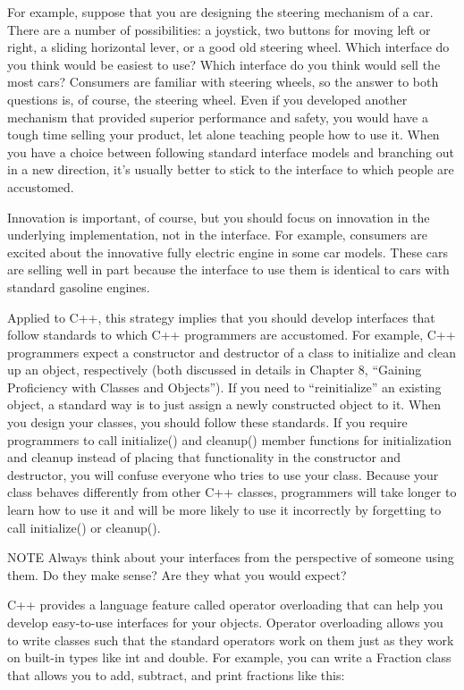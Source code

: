 For example, suppose that you are designing the steering mechanism of a car. There are a number of possibilities: a joystick, two buttons for moving left or right, a sliding horizontal lever, or a good old steering wheel. Which interface do you think would be easiest to use? Which interface do you think would sell the most cars? Consumers are familiar with steering wheels, so the answer to both questions is, of course, the steering wheel. Even if you developed another mechanism that provided superior performance and safety, you would have a tough time selling your product, let alone teaching people how to use it. When you have a choice between following standard interface models and branching out in a new direction, it’s usually better to stick to the interface to which people are accustomed.

Innovation is important, of course, but you should focus on innovation in the underlying implementation, not in the interface. For example, consumers are excited about the innovative fully electric engine in some car models. These cars are selling well in part because the interface to use them is identical to cars with standard gasoline engines.

Applied to C++, this strategy implies that you should develop interfaces that follow standards to which C++ programmers are accustomed. For example, C++ programmers expect a constructor and destructor of a class to initialize and clean up an object, respectively (both discussed in details in Chapter 8, “Gaining Proficiency with Classes and Objects”). If you need to “reinitialize” an existing object, a standard way is to just assign a newly constructed object to it. When you design your classes, you should follow these standards. If you require programmers to call initialize() and cleanup() member functions for initialization and cleanup instead of placing that functionality in the constructor and destructor, you will confuse everyone who tries to use your class. Because your class behaves differently from other C++ classes, programmers will take longer to learn how to use it and will be more likely to use it incorrectly by forgetting to call initialize() or cleanup().

\begin{myNotic}{NOTE}
Always think about your interfaces from the perspective of someone using them. Do they make sense? Are they what you would expect?
\end{myNotic}

C++ provides a language feature called operator overloading that can help you develop easy-to-use interfaces for your objects. Operator overloading allows you to write classes such that the standard operators work on them just as they work on built-in types like int and double. For example, you can write a Fraction class that allows you to add, subtract, and print fractions like this:

